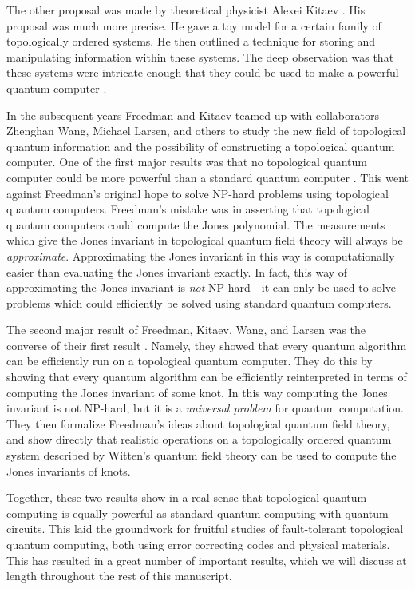 \documentclass{article}
\theoremstyle{definition}
\newcommand{\0}{\left|0\right>}
\newcommand{\1}{\left|1\right>}
\numberwithin{figure}{section}
\begin{document}
The other proposal was made by theoretical physicist Alexei Kitaev \cite{kitaev2003fault}. His proposal was much more precise. He gave a toy model for a certain family of topologically ordered systems. He then outlined a technique for storing and manipulating information within these systems. The deep observation was that these systems were intricate enough that they could be used to make a powerful quantum computer \cite{mochon2003anyons}.

In the subsequent years Freedman and Kitaev teamed up with collaborators Zhenghan Wang, Michael Larsen, and others to study the new field of topological quantum information and the possibility of constructing a topological quantum computer. One of the first major results was that no topological quantum computer could be more powerful than a standard quantum computer \cite{freedman2002simulation}. This went against Freedman’s original hope to solve NP-hard problems using topological quantum computers. Freedman’s mistake was in asserting that topological quantum computers could compute the Jones polynomial. The measurements which give the Jones invariant in topological quantum field theory will always be \textit{approximate}. Approximating the Jones invariant in this way is computationally easier than evaluating the Jones invariant exactly. In fact, this way of approximating the Jones invariant is \textit{not} NP-hard - it can only be used to solve problems which could efficiently be solved using standard quantum computers.

The second major result of Freedman, Kitaev, Wang, and Larsen was the converse of their first result \cite{freedman2002modular}. Namely, they showed that every quantum algorithm can be efficiently run on a topological quantum computer. They do this by showing that every quantum algorithm can be efficiently reinterpreted in terms of computing the Jones invariant of some knot. In this way computing the Jones invariant is not NP-hard, but it is a \textit{universal problem} for quantum computation. They then formalize Freedman’s ideas about topological quantum field theory, and show directly that realistic operations on a topologically ordered quantum system described by Witten’s quantum field theory can be used to compute the Jones invariants of knots.

Together, these two results show in a real sense that topological quantum computing is equally powerful as standard quantum computing with quantum circuits. This laid the groundwork for fruitful studies of fault-tolerant topological quantum computing, both using error correcting codes and physical materials. This has resulted in a great number of important results, which we will discuss at length throughout the rest of this manuscript.
\end{document}
